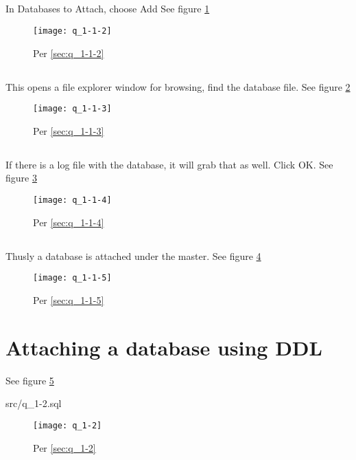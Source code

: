 \documentclass{article}
\begin{document}
\subsection{} In Databases to Attach, choose Add \label{sec:q_1-1-2}
See figure \ref{fig:q_1-1-2}
\begin{figure}[H]\centering
	\caption{Per \ref{sec:q_1-1-2}}
	\texttt{[image: q\_1-1-2]}
	\label{fig:q_1-1-2}
\end{figure}
\subsection{} This opens a file explorer window for browsing, find the database file.
\label{sec:q_1-1-3}
See figure \ref{fig:q_1-1-3}
\begin{figure}[H]\centering
	\caption{Per \ref{sec:q_1-1-3}}
	\texttt{[image: q\_1-1-3]}
	\label{fig:q_1-1-3}
\end{figure}
\subsection{} If there is a log file with the database, it will grab that as well. Click
OK.\label{sec:q_1-1-4}
See figure \ref{fig:q_1-1-4}
\begin{figure}[H]\centering
	\caption{Per \ref{sec:q_1-1-4}}
	\texttt{[image: q\_1-1-4]}
	\label{fig:q_1-1-4}
\end{figure}
\subsection{} Thusly a database is attached under the master. \label{sec:q_1-1-5}
See figure \ref{fig:q_1-1-5}
\begin{figure}[H]\centering
	\caption{Per \ref{sec:q_1-1-5}}
	\texttt{[image: q\_1-1-5]}
	\label{fig:q_1-1-5}
\end{figure}

\section{Attaching a database using DDL}
See figure \ref{fig:q_1-2}
\label{sec:q_1-2}
\begin{lstinputlisting}[float]{src/q_1-2.sql}
\end{lstinputlisting}
\begin{figure}[H]\centering
	\caption{Per \ref{sec:q_1-2}}
	\texttt{[image: q\_1-2]}
	\label{fig:q_1-2}
\end{figure}
\end{document}
